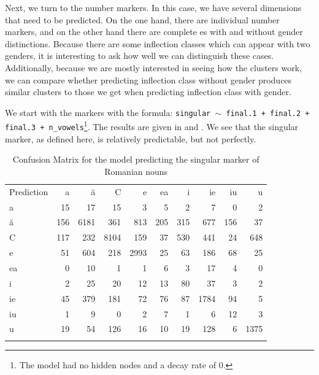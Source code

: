 Next, we turn to the number markers. In this case, we have several dimensions that need to be predicted. On the one hand, there are individual number markers, and on the other hand there are complete es with and without gender distinctions. Because there are some inflection classes which can appear with two genders, it is interesting to ask how well we can distinguish these cases.  Additionally, because we are mostly interested in seeing how the clusters work, we can compare whether predicting inflection class without gender produces similar clusters to those we get when predicting inflection class with gender.

We start with the  markers with the formula: \texttt{singular $\sim$ final.1 + final.2 + final.3 + n\_vowels}\footnote{The model had no hidden nodes and a decay rate of 0.}. The results are given in  and . We see that the singular marker, as defined here, is relatively predictable, but not perfectly.

\begin{table}
  \centering
  \begin{tabular}{lrrrrrrrrr}
    \lsptoprule
    \multicolumn{10}{c}{Reference}                                         \\
    \midrule
    Prediction & a   & ă    & C    & e    & ea  & i   & ie   & iu  & u    \\
    a          & 15  & 17   & 15   & 3    & 5   & 2   & 7    & 0   & 2    \\
    ă          & 156 & 6181 & 361  & 813  & 205 & 315 & 677  & 156 & 37   \\
    C          & 117 & 232  & 8104 & 159  & 37  & 530 & 441  & 24  & 648  \\
    e          & 51  & 604  & 218  & 2993 & 25  & 63  & 186  & 68  & 25   \\
    ea         & 0   & 10   & 1    & 1    & 6   & 3   & 17   & 4   & 0    \\
    i          & 2   & 25   & 20   & 12   & 13  & 80  & 37   & 3   & 2    \\
    ie         & 45  & 379  & 181  & 72   & 76  & 87  & 1784 & 94  & 5    \\
    iu         & 1   & 9    & 0    & 2    & 7   & 1   & 6    & 12  & 3    \\
    u          & 19  & 54   & 126  & 16   & 10  & 19  & 128  & 6   & 1375 \\
    \lspbottomrule
  \end{tabular}
  \caption{Confusion Matrix for the model predicting the singular marker of Romanian nouns}\label{tab:singular-romanian}
\end{table}

